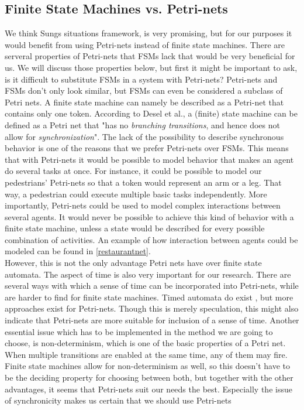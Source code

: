 \documentclass[11pt, a4paper]{book}
\begin{document}

\subsection{Finite State Machines vs. Petri-nets}
We think Sungs situations framework, is very promising, but for our purposes it would benefit from using Petri-nets instead of finite state machines. There are serveral properties of Petri-nets that FSMs lack that would be very beneficial for us. We will discuss those properties below, but first it might be important to ask, is it difficult to substitute FSMs in a system with Petri-nets? Petri-nets and FSMs don't only look similar, but FSMs can even be considered a subclass of Petri nets. A finite state machine can namely be described as a Petri-net that contains only one token. According to Desel et al., a (finite) state machine can be defined as a Petri net that "has no \emph{branching transitions}, and hence does not allow for \emph{synchronization}". The lack of the possibility to describe synchronous behavior is one of the reasons that we prefer Petri-nets over FSMs. This means that with Petri-nets it would be possible to model behavior that makes an agent do several tasks at once. For instance, it could be possible to model our pedestrians' Petri-nets so that a token would represent an arm or a leg. That way, a pedestrian could execute multiple basic tasks independently. More importantly, Petri-nets could be used to model complex interactions between several agents. It would never be possible to achieve this kind of behavior with a finite state machine, unless a state would be described for every possible combination of activities.  An example of how interaction between agents could be modeled can be found in \ref{restaurantnet}.\\
However, this is not the only advantage Petri nets have over finite state automata. The aspect of time is also very important for our research. There are several ways with which a sense of time can be incorporated into Petri-nets, while are harder to find for finite state machines. Timed automata do exist \cite{alur1994theory}, but more approaches exist for Petri-nets. Though this is merely speculation, this might also indicate that Petri-nets are more suitable for inclusion of a sense of time. Another essential issue which has to be implemented in the method we are going to choose, is non-determinism, which is one of the basic properties of a Petri net. When multiple transitions are enabled at the same time, any of them may fire. Finite state machines allow for non-determinism as well, so this doesn't have to be the deciding property for choosing between both, but together with the other advantages, it seems that Petri-nets suit our needs the best. Especially the issue of synchronicity makes us certain that we should use Petri-nets
\end{document}
